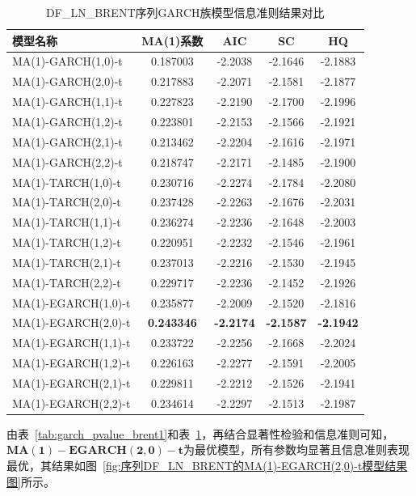 \documentclass[12pt,a4paper]{ctexart}
\begin{document}
\begin{table}[H]
\centering
\caption{DF\_LN\_BRENT序列GARCH族模型信息准则结果对比}
\label{tab:garch_info_criteria_brent1}
\setlength{\tabcolsep}{12pt}
\begin{tabular}{lcccc}
\toprule[1.2pt]
模型名称 & MA(1)系数 & AIC & SC & HQ \\
\midrule[0.75pt]
MA(1)-GARCH(1,0)-t & 0.187003 & -2.2038 & -2.1646 & -2.1883 \\
MA(1)-GARCH(2,0)-t & 0.217883 & -2.2071 & -2.1581 & -2.1877 \\
MA(1)-GARCH(1,1)-t & 0.227823 & -2.2190 & -2.1700 & -2.1996 \\
MA(1)-GARCH(1,2)-t & 0.223801 & -2.2153 & -2.1566 & -2.1921 \\
MA(1)-GARCH(2,1)-t & 0.213462 & -2.2204 & -2.1616 & -2.1971 \\
MA(1)-GARCH(2,2)-t & 0.218747 & -2.2171 & -2.1485 & -2.1900 \\
\midrule
MA(1)-TARCH(1,0)-t & 0.230716 & -2.2274 & -2.1784 & -2.2080 \\
MA(1)-TARCH(2,0)-t & 0.237428 & -2.2263 & -2.1676 & -2.2031 \\
MA(1)-TARCH(1,1)-t & 0.236274 & -2.2236 & -2.1648 & -2.2003 \\
MA(1)-TARCH(1,2)-t & 0.220951 & -2.2232 & -2.1546 & -2.1961 \\
MA(1)-TARCH(2,1)-t & 0.237013 & -2.2216 & -2.1530 & -2.1945 \\
MA(1)-TARCH(2,2)-t & 0.229717 & -2.2236 & -2.1452 & -2.1926 \\
\midrule
MA(1)-EGARCH(1,0)-t & 0.235877 & -2.2009 & -2.1520 & -2.1816 \\
MA(1)-EGARCH(2,0)-t & \textbf{0.243346} & \textbf{-2.2174} & \textbf{-2.1587} & \textbf{-2.1942} \\
MA(1)-EGARCH(1,1)-t & 0.233722 & -2.2256 & -2.1668 & -2.2024 \\
MA(1)-EGARCH(1,2)-t & 0.226163 & -2.2277 & -2.1591 & -2.2005 \\
MA(1)-EGARCH(2,1)-t & 0.229811 & -2.2212 & -2.1526 & -2.1941 \\
MA(1)-EGARCH(2,2)-t & 0.234614 & -2.2297 & -2.1513 & -2.1987 \\
\bottomrule[1.2pt]
\end{tabular}
\end{table}

由表~\ref{tab:garch_pvalue_brent1}和表~\ref{tab:garch_info_criteria_brent1}，再结合显著性检验和信息准则可知，$\mathbf{MA}\left( \mathbf{1} \right) -\mathbf{EGARCH}\left( \mathbf{2},\mathbf{0} \right) -\mathbf{t}$为最优模型，所有参数均显著且信息准则表现最优，其结果如图~\ref{fig:序列DF_LN_BRENT的MA(1)-EGARCH(2,0)-t模型结果图}所示。
\end{document}
